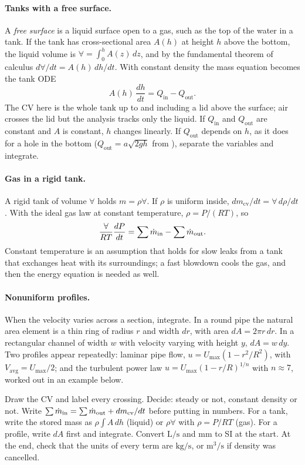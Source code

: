 \paragraph{Tanks with a free surface.} A \emph{free surface} is a liquid surface open to a gas, such as the top of the water in a tank. If the tank has cross-sectional area $A(h)$ at height $h$ above the bottom, the liquid volume is $\forall = \int_0^h A(z)\,dz$, and by the fundamental theorem of calculus $d\forall/dt = A(h)\,dh/dt$. With constant density the mass equation becomes the tank ODE
\[
A(h)\,\frac{dh}{dt} = Q_\text{in} - Q_\text{out} .
\]
The CV here is the whole tank up to and including a lid above the surface; air crosses the lid but the analysis tracks only the liquid. If $Q_\text{in}$ and $Q_\text{out}$ are constant and $A$ is constant, $h$ changes linearly. If $Q_\text{out}$ depends on $h$, as it does for a hole in the bottom ($Q_\text{out} = a\sqrt{2gh}$ from ), separate the variables and integrate.

\paragraph{Gas in a rigid tank.} A rigid tank of volume $\forall$ holds $m = \rho\forall$. If $\rho$ is uniform inside, $dm_\text{cv}/dt = \forall\,d\rho/dt$. With the ideal gas law at constant temperature, $\rho = P/(RT)$, so
\[
\frac{\forall}{RT}\frac{dP}{dt} = \sum\dot m_\text{in} - \sum\dot m_\text{out}.
\]
Constant temperature is an assumption that holds for slow leaks from a tank that exchanges heat with its surroundings; a fast blowdown cools the gas, and then the energy equation is needed as well.

\paragraph{Nonuniform profiles.} When the velocity varies across a section, integrate. In a round pipe the natural area element is a thin ring of radius $r$ and width $dr$, with area $dA = 2\pi r\,dr$. In a rectangular channel of width $w$ with velocity varying with height $y$, $dA = w\,dy$. Two profiles appear repeatedly: laminar pipe flow, $u = U_\text{max}(1 - r^2/R^2)$, with $V_\text{avg} = U_\text{max}/2$; and the turbulent power law $u = U_\text{max}(1 - r/R)^{1/n}$ with $n \approx 7$, worked out in an example below.

\begin{firstmoves}
Draw the CV and label every crossing. Decide: steady or not, constant density or not. Write $\sum\dot m_\text{in} = \sum\dot m_\text{out} + dm_\text{cv}/dt$ before putting in numbers. For a tank, write the stored mass as $\rho\int A\,dh$ (liquid) or $\rho\forall$ with $\rho = P/RT$ (gas). For a profile, write $dA$ first and integrate. Convert $\mathrm{L/s}$ and $\mathrm{mm}$ to SI at the start. At the end, check that the units of every term are $\mathrm{kg/s}$, or $\mathrm{m^3/s}$ if density was cancelled.
\end{firstmoves}

